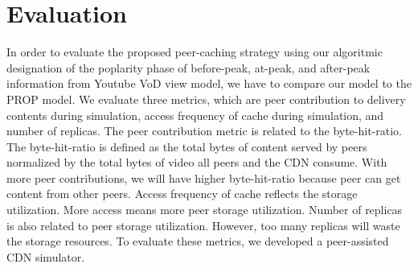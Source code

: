 \documentclass[10pt,final,journal,a4paper]{IEEEtran}
\begin{document}




\section{Evaluation}\label{evaluation}

In order to evaluate the proposed peer-caching strategy using our algoritmic designation of the poplarity phase of before-peak, at-peak, and after-peak information from Youtube VoD view model, we have to compare our model to the PROP model.
We evaluate three metrics, which are peer contribution to delivery contents during simulation,  access frequency of cache during simulation, and number of replicas. 
The peer contribution metric is related to the byte-hit-ratio. 
The byte-hit-ratio is defined as the total bytes of content served by peers normalized by the total bytes of video all peers and the CDN consume.
With more peer contributions, we will have higher byte-hit-ratio because peer can get content from other peers. 
Access frequency of cache reflects the storage utilization. 
More access means more peer storage utilization.  
Number of replicas is also related to peer storage utilization.  
However, too many replicas will waste the storage resources.
To evaluate these metrics, we developed a peer-assisted CDN simulator. 
\end{document}
